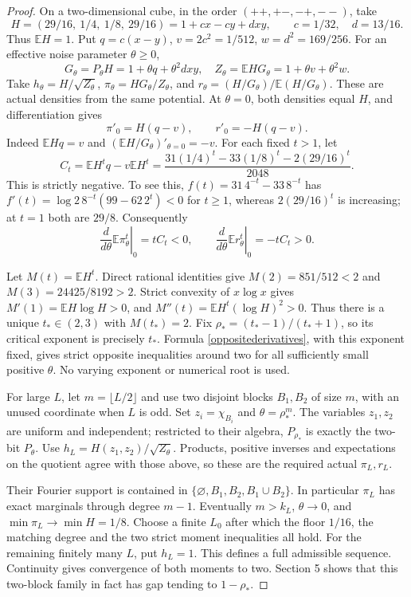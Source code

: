 \documentclass[11pt]{article}
\newcommand{\E}{\mathbb E}
\begin{document}
\begin{proof}
On a two-dimensional cube, in the order $(++,+-,-+,--)$, take
\[
 H=(29/16,\ 1/4,\ 1/8,\ 29/16)
   =1+cx-cy+dxy,\qquad c=1/32,\quad d=13/16.
\]
Thus $\E H=1$. Put $q=c(x-y)$, $v=2c^2=1/512$, $w=d^2=169/256$. For an effective noise parameter $\theta\geq0$,
\[
 G_\theta=P_\theta H=1+\theta q+\theta^2dxy,
 \quad Z_\theta=\E HG_\theta=1+\theta v+\theta^2w.
\]
Take $h_\theta=H/\sqrt{Z_\theta}$, $\pi_\theta=HG_\theta/Z_\theta$, and
$r_\theta=(H/G_\theta)/\E(H/G_\theta)$. These are actual densities from the same potential. At $\theta=0$, both densities equal $H$, and differentiation gives
\[
 \pi'_0=H(q-v),\qquad r'_0=-H(q-v).
\]
Indeed $\E Hq=v$ and $(\E H/G_\theta)'_{\theta=0}=-v$. For each fixed $t>1$, let
\[
 C_t=\E H^tq-v\E H^t
 =\frac{31(1/4)^t-33(1/8)^t-2(29/16)^t}{2048}.
\]
This is strictly negative. To see this, $f(t)=31\,4^{-t}-33\,8^{-t}$ has
$f'(t)=\log2\,8^{-t}(99-62\,2^t)<0$ for $t\geq1$, whereas $2(29/16)^t$ is increasing; at $t=1$ both are $29/8$. Consequently
\begin{equation}\label{oppositederivatives}
 \left.\frac{d}{d\theta}\E\pi_\theta^t\right|_0=tC_t<0,
 \qquad
 \left.\frac{d}{d\theta}\E r_\theta^t\right|_0=-tC_t>0.
\end{equation}

Let $M(t)=\E H^t$. Direct rational identities give
$M(2)=851/512<2$ and $M(3)=24425/8192>2$.
Strict convexity of $x\log x$ gives $M'(1)=\E H\log H>0$, and
$M''(t)=\E H^t(\log H)^2>0$. Thus there is a unique $t_*\in(2,3)$ with $M(t_*)=2$. Fix $\rho_*=(t_*-1)/(t_*+1)$, so its critical exponent is precisely $t_*$. Formula \eqref{oppositederivatives}, with this exponent fixed, gives strict opposite inequalities around two for all sufficiently small positive $\theta$. No varying exponent or numerical root is used.

For large $L$, let $m=\lfloor L/2\rfloor$ and use two disjoint blocks $B_1,B_2$ of size $m$, with an unused coordinate when $L$ is odd. Set $z_i=\chi_{B_i}$ and $\theta=\rho_*^m$. The variables $z_1,z_2$ are uniform and independent; restricted to their algebra, $P_{\rho_*}$ is exactly the two-bit $P_\theta$. Use $h_L=H(z_1,z_2)/\sqrt{Z_\theta}$. Products, positive inverses and expectations on the quotient agree with those above, so these are the required actual $\pi_L,r_L$.

Their Fourier support is contained in
$\{\varnothing,B_1,B_2,B_1\cup B_2\}$. In particular $\pi_L$ has exact marginals through degree $m-1$. Eventually $m>k_L$, $\theta\to0$, and $\min\pi_L\to\min H=1/8$. Choose a finite $L_0$ after which the floor $1/16$, the matching degree and the two strict moment inequalities all hold. For the remaining finitely many $L$, put $h_L=1$. This defines a full admissible sequence. Continuity gives convergence of both moments to two. Section 5 shows that this two-block family in fact has gap tending to $1-\rho_*$.
\end{proof}
\end{document}
